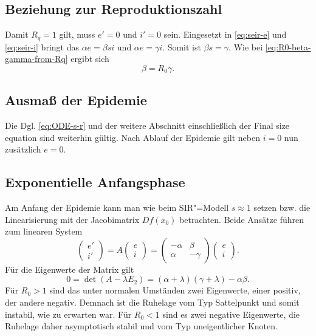 \documentclass[a4paper,10pt,fleqn,twocolumn,twoside,dvipdfmx]{scrartcl}
\numberwithin{equation}{section}
\begin{document}
\subsection{Beziehung zur Reproduktionszahl}

Damit $R_q=1$ gilt, muss $e'=0$ und $i'=0$ sein. Eingesetzt in
\eqref{eq:seir-e} und \eqref{eq:seir-i} bringt das $\alpha e=\beta si$
und $\alpha e = \gamma i$. Somit ist $\beta s = \gamma$. Wie
bei \eqref{eq:R0-beta-gamma-from-Rq} ergibt sich
\begin{equation}
\beta = R_0\gamma.
\end{equation}

\subsection{Ausmaß der Epidemie}

Die Dgl. \eqref{eq:ODE-s-r} und der weitere Abschnitt
einschließlich der Final size equation sind weiterhin gültig.
Nach Ablauf der Epidemie gilt neben $i=0$ nun zusätzlich $e=0$.

\subsection{Exponentielle Anfangsphase}

Am Anfang der Epidemie kann man wie beim SIR"=Modell $s\approx 1$ setzen
bzw. die Linearisierung mit der Jacobimatrix $Df(x_0)$ betrachten.
Beide Ansätze führen zum linearen System
\begin{equation}\label{eq:ei-linear}
\begin{pmatrix}e'\\ i'
\end{pmatrix}
= A\begin{pmatrix}
e\\ i
\end{pmatrix}
= \begin{pmatrix}
-\alpha & \beta\\
\alpha & -\gamma
\end{pmatrix}
\begin{pmatrix}
e\\ i
\end{pmatrix}.
\end{equation}
Für die Eigenwerte der Matrix gilt
\begin{equation}\label{eq:ei-eigenvalue}
0 = \det(A-\lambda E_2) = (\alpha+\lambda)(\gamma+\lambda)-\alpha\beta.
\end{equation}
Für $R_0>1$ sind das unter normalen Umständen zwei Eigenwerte,
einer positiv, der andere negativ. Demnach ist die Ruhelage
vom Typ Sattelpunkt und somit instabil, wie zu erwarten war.
Für $R_0<1$ sind es zwei negative Eigenwerte, die Ruhelage daher
asymptotisch stabil und vom Typ uneigentlicher Knoten.
\end{document}
